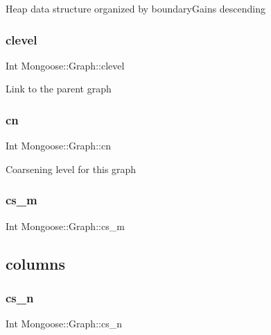 Heap data structure organized by boundary\+Gains descending \hypertarget{class_mongoose_1_1_graph_a818aebc0f65b8d35b81c71c61f4f87d6}{}\label{class_mongoose_1_1_graph_a818aebc0f65b8d35b81c71c61f4f87d6} 
\subsubsection{\texorpdfstring{clevel}{clevel}}
{\footnotesize\ttfamily Int Mongoose\+::\+Graph\+::clevel}

Link to the parent graph \hypertarget{class_mongoose_1_1_graph_a1a922066f6afd660db26a8b7f8f87427}{}\label{class_mongoose_1_1_graph_a1a922066f6afd660db26a8b7f8f87427} 
\subsubsection{\texorpdfstring{cn}{cn}}
{\footnotesize\ttfamily Int Mongoose\+::\+Graph\+::cn}

Coarsening level for this graph \hypertarget{class_mongoose_1_1_graph_a66c252163205fa7d5ca6fd50812724dd}{}\label{class_mongoose_1_1_graph_a66c252163205fa7d5ca6fd50812724dd} 
\subsubsection{\texorpdfstring{cs\+\_\+m}{cs\_m}}
{\footnotesize\ttfamily Int Mongoose\+::\+Graph\+::cs\+\_\+m}

\subsection*{columns}\hypertarget{class_mongoose_1_1_graph_a83cb71d4acb332e402220e2899667da0}{}\label{class_mongoose_1_1_graph_a83cb71d4acb332e402220e2899667da0} 
\subsubsection{\texorpdfstring{cs\+\_\+n}{cs\_n}}
{\footnotesize\ttfamily Int Mongoose\+::\+Graph\+::cs\+\_\+n}

